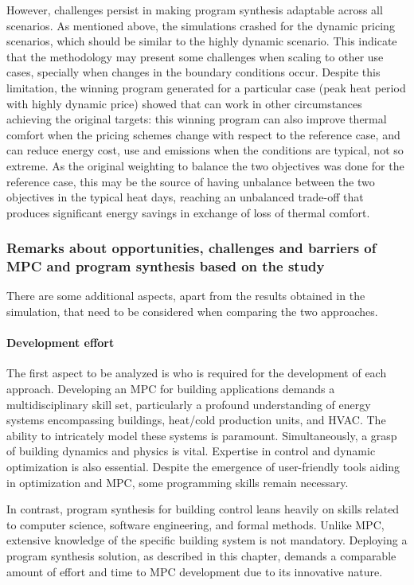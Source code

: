 However, challenges persist in making program synthesis adaptable across all scenarios. As mentioned above, the simulations crashed for the dynamic pricing scenarios, which should be similar to the highly dynamic scenario. This indicate that the methodology may present some challenges when scaling to other use cases, specially when changes in the boundary conditions occur. Despite this limitation, the winning program generated for a particular case (peak heat period with highly dynamic price) showed that can work in other circumstances achieving the original targets: this winning program can also improve thermal comfort when the pricing schemes change with respect to the reference case, and can reduce energy cost, use and emissions when the conditions are typical, not so extreme. As the original weighting to balance the two objectives was done for the reference case, this may be the source of having unbalance between the two objectives in the typical heat days, reaching an unbalanced trade-off that produces significant energy savings in exchange of loss of thermal comfort.

\subsubsection{Remarks about opportunities, challenges and barriers of MPC and program synthesis based on the study}

There are some additional aspects, apart from the results obtained in the simulation, that need to be considered when comparing the two approaches.

\paragraph{Development effort}
The first aspect to be analyzed is who is required for the development of each approach. 
Developing an MPC for building applications demands a multidisciplinary skill set, particularly a profound understanding of energy systems encompassing buildings, heat/cold production units, and HVAC. The ability to intricately model these systems is paramount. Simultaneously, a grasp of building dynamics and physics is vital. Expertise in control and dynamic optimization is also essential. Despite the emergence of user-friendly tools aiding in optimization and MPC, some programming skills remain necessary. 

In contrast, program synthesis for building control leans heavily on skills related to computer science, software engineering, and formal methods. Unlike MPC, extensive knowledge of the specific building system is not mandatory. Deploying a program synthesis solution, as described in this chapter, demands a comparable amount of effort and time to MPC development due to its innovative nature.

